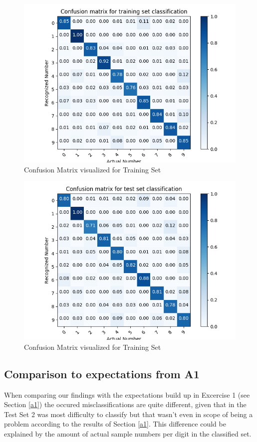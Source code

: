 \documentclass{article}
\begin{document}
\begin{figure}[H]
\centering
\includegraphics[width=0.9\linewidth]{img/cftrain.png}
\caption{Confusion Matrix visualized for Training Set}
\label{fig:cftrain}
\end{figure}
\begin{figure}[H]
\centering
\includegraphics[width=0.9\linewidth]{img/cftest.png}
\caption{Confusion Matrix visualized for Training Set}
\label{fig:cftest}
\end{figure}

\subsection{Comparison to expectations from A1}
When comparing our findings with the expectations build up in Excercise 1 (see Section \ref{a1}) the occured misclassifications are quite different, given that in the Test Set 2 was most difficulty to classify but that wasn't even in scope of being a problem according to the results of Section \ref{a1}.
This difference could be explained by the amount of actual sample numbers per digit in the classified set.
\end{document}
